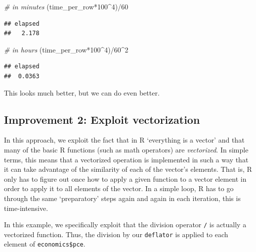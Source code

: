 \documentclass[
  12pt,
]{style/krantz}
\newenvironment{Shaded}{\begin{snugshade}}{\end{snugshade}}
\newcommand{\CommentTok}[1]{\textcolor[rgb]{0.56,0.35,0.01}{\textit{#1}}}
\newcommand{\DecValTok}[1]{\textcolor[rgb]{0.00,0.00,0.81}{#1}}
\newcommand{\NormalTok}[1]{#1}
\newcommand{\SpecialCharTok}[1]{\textcolor[rgb]{0.00,0.00,0.00}{#1}}
\begin{document}
\begin{Shaded}
\begin{Highlighting}[]
\CommentTok{\# in minutes}
\NormalTok{(time\_per\_row}\SpecialCharTok{*}\DecValTok{100}\SpecialCharTok{\^{}}\DecValTok{4}\NormalTok{)}\SpecialCharTok{/}\DecValTok{60} 
\end{Highlighting}
\end{Shaded}

\begin{verbatim}
## elapsed 
##   2.178
\end{verbatim}

\begin{Shaded}
\begin{Highlighting}[]
\CommentTok{\# in hours}
\NormalTok{(time\_per\_row}\SpecialCharTok{*}\DecValTok{100}\SpecialCharTok{\^{}}\DecValTok{4}\NormalTok{)}\SpecialCharTok{/}\DecValTok{60}\SpecialCharTok{\^{}}\DecValTok{2} 
\end{Highlighting}
\end{Shaded}

\begin{verbatim}
## elapsed 
##  0.0363
\end{verbatim}

This looks much better, but we can do even better.

\hypertarget{improvement-2-exploit-vectorization}{%
\subsection{Improvement 2: Exploit vectorization}\label{improvement-2-exploit-vectorization}}

In this approach, we exploit the fact that in R `everything is a vector' and that many of the basic R functions (such as math operators) are \emph{vectorized}. In simple terms, this means that a vectorized operation is implemented in such a way that it can take advantage of the similarity of each of the vector's elements. That is, R only has to figure out once how to apply a given function to a vector element in order to apply it to all elements of the vector. In a simple loop, R has to go through the same `preparatory' steps again and again in each iteration, this is time-intensive.

In this example, we specifically exploit that the division operator \texttt{/} is actually a vectorized function. Thus, the division by our \texttt{deflator} is applied to each element of \texttt{economics\$pce}.
\end{document}
